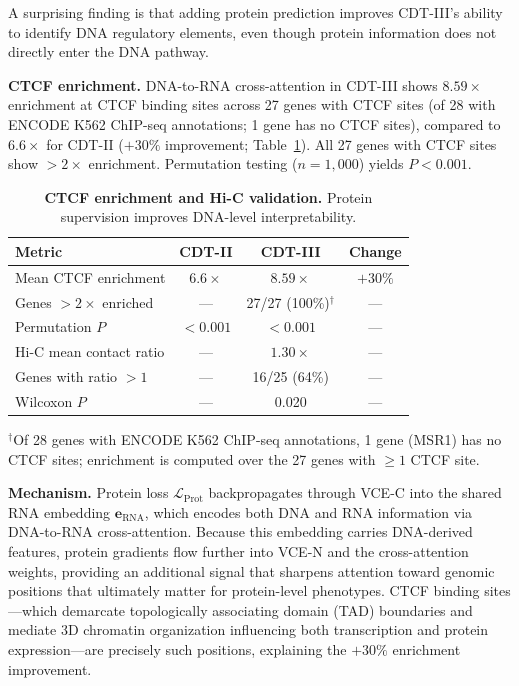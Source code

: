 \documentclass{article}
\begin{document}
A surprising finding is that adding protein prediction improves CDT-III's ability to identify DNA regulatory elements, even though protein information does not directly enter the DNA pathway.

\textbf{CTCF enrichment.} DNA-to-RNA cross-attention in CDT-III shows $8.59\times$ enrichment at CTCF binding sites across 27 genes with CTCF sites (of 28 with ENCODE K562 ChIP-seq annotations; 1 gene has no CTCF sites), compared to $6.6\times$ for CDT-II ($+30\%$ improvement; Table~\ref{tab:ctcf}). All 27 genes with CTCF sites show $>2\times$ enrichment. Permutation testing ($n = 1{,}000$) yields $P < 0.001$.

\begin{table}[t]
\centering
\caption{\textbf{CTCF enrichment and Hi-C validation.} Protein supervision improves DNA-level interpretability.}
\label{tab:ctcf}
\begin{tabular}{lccc}
\toprule
Metric & CDT-II & CDT-III & Change \\
\midrule
Mean CTCF enrichment & $6.6\times$ & $8.59\times$ & $+30\%$ \\
Genes $>2\times$ enriched & --- & 27/27 (100\%)$^\dagger$ & --- \\
Permutation $P$ & $<0.001$ & $<0.001$ & --- \\
\midrule
Hi-C mean contact ratio & --- & $1.30\times$ & --- \\
Genes with ratio $>1$ & --- & 16/25 (64\%) & --- \\
Wilcoxon $P$ & --- & 0.020 & --- \\
\bottomrule
\end{tabular}
\begin{flushleft}
\footnotesize{$^\dagger$Of 28 genes with ENCODE K562 ChIP-seq annotations, 1 gene (MSR1) has no CTCF sites; enrichment is computed over the 27 genes with $\geq 1$ CTCF site.}
\end{flushleft}
\end{table}

\textbf{Mechanism.} Protein loss $\mathcal{L}_{\text{Prot}}$ backpropagates through VCE-C into the shared RNA embedding $\mathbf{e}_{\text{RNA}}$, which encodes both DNA and RNA information via DNA-to-RNA cross-attention. Because this embedding carries DNA-derived features, protein gradients flow further into VCE-N and the cross-attention weights, providing an additional signal that sharpens attention toward genomic positions that ultimately matter for protein-level phenotypes. CTCF binding sites---which demarcate topologically associating domain (TAD) boundaries and mediate 3D chromatin organization influencing both transcription and protein expression---are precisely such positions, explaining the $+30\%$ enrichment improvement.
\end{document}
